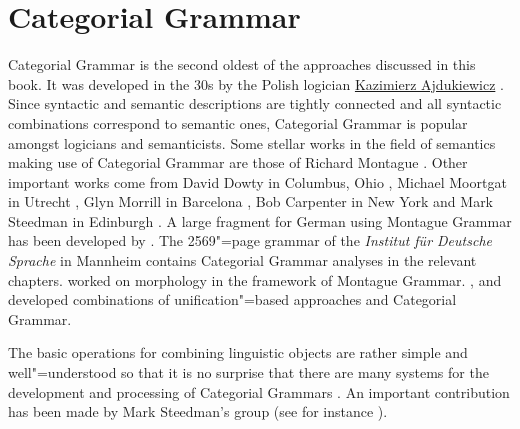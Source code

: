 
\chapter{Categorial Grammar}
\label{Kapitel-CG}\label{chap-CG}



Categorial Grammar is the second oldest of the approaches discussed in this book. It was developed in the 30s by the Polish logician
\href{http://en.wikipedia.org/wiki/Kazimierz_Ajdukiewicz}{Kazimierz Ajdukiewicz}
\citep{Ajdukiewicz35a-u}. Since syntactic and semantic descriptions are tightly connected and all syntactic combinations correspond
to semantic ones, Categorial Grammar is popular amongst logicians and semanticists.
Some stellar works in the field of semantics making use of Categorial Grammar are those of Richard Montague \citeyearpar{Montague74a-ed}.
Other important works come from David Dowty in Columbus, Ohio \citeyearpar{Dowty79a}, Michael
Moortgat in Utrecht \citeyearpar{Moortgat89a-u}, Glyn Morrill in Barcelona
\citeyearpar{Morrill94a-u}, Bob Carpenter in New York \citeyearpar{Carpenter98a-u} and Mark Steedman
in Edinburgh \citeyearpar{Steedman91a,Steedman97a,Steedman2000a-u}. A large fragment for German using Montague Grammar has been developed by .
The 2569"=page grammar of the \emph{Institut für Deutsche Sprache} in Mannheim \citep*{IDS97} contains Categorial Grammar analyses in the relevant chapters.
\citet{Fanselow81a-u} worked on morphology in the framework of Montague Grammar.  \citet{Uszkoreit86d},
\citet{Karttunen86a,Karttunen89a-u} and \citet*{CKZ88a} developed combinations of unification"=based approaches and Categorial Grammar.

The basic operations for combining linguistic objects are rather simple and well"=understood so
that it is no surprise that there are many systems for the development and processing of Categorial Grammars
\citep*{YK90a-u,Carpenter1994a-u,BvN94a-u,Llore1995a-u,KoenigE99a-u,Moot2002a-u,WB2003a-u,BCPW2007a,Morrill2012a,Morrill2017a-u}. An
important contribution has been made by Mark Steedman's group (see for instance \citealp*{CHS2002a-u,CC2007a-u}).


